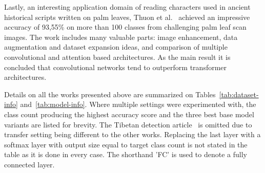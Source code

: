 \documentclass[english,twoside,openright]{UH_DS_MSc}
\begin{document}





Lastly, an interesting application domain of reading characters used in ancient historical scripts written 
on palm leaves, Thuon et al.~\cite{9thuonPalm} achieved an impressive accuracy of 93,55\% on more than 100 
classes from challenging palm leaf scan images. The work includes many valuable parts: image enhancement,
data augmentation and dataset expansion ideas, and comparison of multiple convolutional and attention based 
architectures. As the main result it is concluded that convolutional networks tend to outperform transformer architectures.

Details on all the works presented above are summarized on Tables~\ref{tab:dataset-info} and~\ref{tab:model-info}. Where multiple settings 
were experimented with, the class count producing the highest accuracy score and the three best 
base model variants are listed for brevity. The Tibetan detection article~\cite{4zhaoTibetan}
is omitted due to transfer setting being different to the other works. Replacing the last layer with a 
softmax layer with output size equal to target class count is not 
stated in the table as it is done in every case. The shorthand 'FC' is used to denote a fully connected layer.
\end{document}

